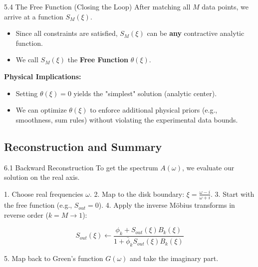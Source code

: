 \documentclass[aspectratio=169, 11pt]{beamer}
\begin{document}
\begin{frame}{5.4 The Free Function (Closing the Loop)}
    After matching all $M$ data points, we arrive at a function $S_M(\xi)$.
    
    \begin{itemize}
        \item Since all constraints are satisfied, $S_M(\xi)$ can be \textbf{any} contractive analytic function.
        \item We call $S_M(\xi)$ the \textbf{Free Function} $\theta(\xi)$.
    \end{itemize}
    
    \textbf{Physical Implications:}
    \begin{itemize}
        \item Setting $\theta(\xi) = 0$ yields the "simplest" solution (analytic center).
        \item We can optimize $\theta(\xi)$ to enforce additional physical priors (e.g., smoothness, sum rules) without violating the experimental data bounds.
    \end{itemize}
\end{frame}

\subsection{Reconstruction and Summary}

\begin{frame}{6.1 Backward Reconstruction}
    To get the spectrum $A(\omega)$, we evaluate our solution on the real axis.
    
    1. Choose real frequencies $\omega$.
    2. Map to the disk boundary: $\xi = \frac{\omega - i}{\omega + i}$.
    3. Start with the free function (e.g., $S_{out} = 0$).
    4. Apply the inverse Möbius transforms in reverse order ($k=M \to 1$):
    
    \begin{equation}
        S_{out}(\xi) \leftarrow \frac{\phi_k + S_{out}(\xi) B_k(\xi)}{1 + \bar{\phi}_k S_{out}(\xi) B_k(\xi)}
    \end{equation}
    
    5. Map back to Green's function $G(\omega)$ and take the imaginary part.
\end{frame}
\end{document}
